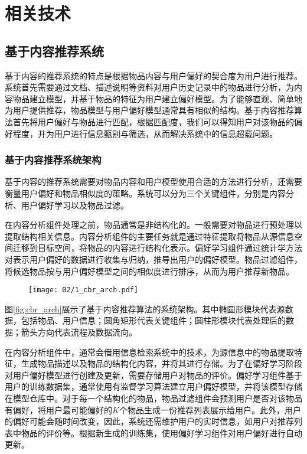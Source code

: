 \chapter{相关技术}
\label{chap:related}

\section{基于内容推荐系统}

基于内容的推荐系统的特点是根据物品内容与用户偏好的契合度为用户进行推荐\cite{lops2011content}。系统首先需要通过文档、描述说明等资料对用户历史记录中的物品进行分析，为内容物品建立模型，并基于物品的特征为用户建立偏好模型。为了能够直观、简单地为用户提供推荐，物品模型与用户偏好模型通常具有相似的结构。基于内容推荐算法首先将用户偏好与物品进行匹配，根据匹配度，我们可以得知用户对该物品的偏好程度，并为用户进行信息甄别与筛选，从而解决系统中的信息超载问题。

\subsection{基于内容推荐系统架构}
基于内容的推荐系统需要对物品内容和用户模型使用合适的方法进行分析，还需要衡量用户偏好和物品相似度的策略。系统可以分为三个关键组件，分别是内容分析、用户偏好学习以及物品过滤。

在内容分析组件处理之前，物品通常是非结构化的。一般需要对物品进行预处理以提取结构相关信息。内容分析组件的主要任务就是通过特征提取将物品从源信息空间迁移到目标空间，将物品的内容进行结构化表示。偏好学习组件通过统计学方法对表示用户偏好的数据进行收集与归纳，推导出用户的偏好模型。物品过滤组件，将候选物品按与用户偏好模型之间的相似度进行排序，从而为用户推荐新物品\cite{herlocker2004evaluating}。

\begin{figure}
 \centering
 \texttt{[image: 02/1\_cbr\_arch.pdf]}
\end{figure}

图\ref{fig:cbr_arch}展示了基于内容推荐算法的系统架构。其中椭圆形模块代表源数据，包括物品、用户信息；圆角矩形代表关键组件；圆柱形模块代表处理后的数据；箭头方向代表流程及数据流向。

在内容分析组件中，通常会借用信息检索系统中的技术，为源信息中的物品提取特征，生成物品描述以及物品的结构化内容，并将其进行存储。为了在偏好学习阶段对用户偏好模型进行创建及更新，需要存储用户对物品的评价\cite{goldberg1992using}。偏好学习组件基于用户的训练数据集，通常使用有监督学习算法建立用户偏好模型，并将该模型存储在模型仓库中。对于每一个结构化的物品，物品过滤组件会预测用户是否对该物品有偏好，将用户最可能偏好的$K$个物品生成一份推荐列表展示给用户。此外，用户的偏好可能会随时间改变，因此，系统还需维护用户的实时信息，如用户对推荐列表中物品的评价等。根据新生成的训练集，使用偏好学习组件对用户偏好进行自动更新。

